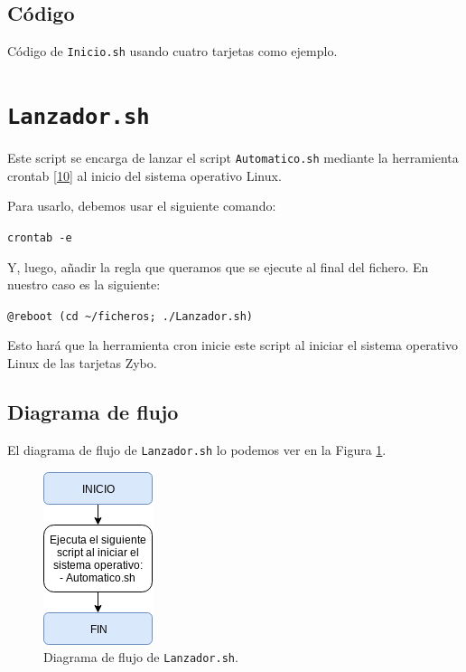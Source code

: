 \newpage
\subsection{Código}

\begin{center}
	Código de \texttt{Inicio.sh} usando cuatro tarjetas como ejemplo.
\end{center}


\section{\texttt{Lanzador.sh}}
\hypertarget{ScriptLanzador}{}
Este script se encarga de lanzar el script \texttt{Automatico.sh} mediante la herramienta crontab \hyperlink{10}{[10]} al inicio del sistema operativo Linux.

Para usarlo, debemos usar el siguiente comando:
\begin{center}
	\texttt{crontab -e}
\end{center}

Y, luego, añadir la regla que queramos que se ejecute al final del fichero. En nuestro caso es la siguiente:
\begin{center}
	\texttt{@reboot (cd \textasciitilde/ficheros; ./Lanzador.sh)}
\end{center}

Esto hará que la herramienta cron inicie este script al iniciar el sistema operativo Linux de las tarjetas Zybo.

\newpage
\subsection{Diagrama de flujo}
El diagrama de flujo de \texttt{Lanzador.sh} lo podemos ver en la Figura \ref{Diagrama de flujo de Lanzador.sh}.
\begin{figure}[h]
	\centering
	\includegraphics[scale=0.9]{Anexos/Anexo3/Diagramas/Lanzador.png}
	\caption{Diagrama de flujo de \texttt{Lanzador.sh}.}
	\label{Diagrama de flujo de Lanzador.sh}
\end{figure}

